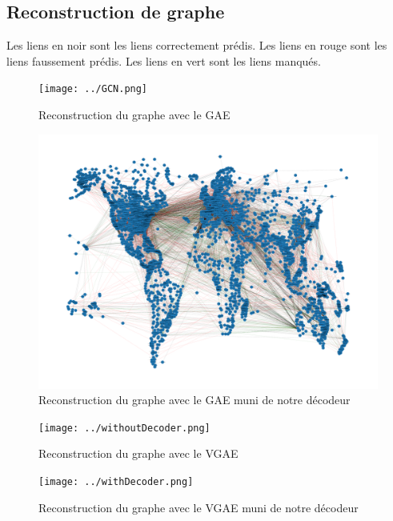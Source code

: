 \documentclass{article}
\begin{document}
\subsection{Reconstruction de graphe}

Les liens en noir sont les liens correctement prédis.\newline
Les liens en rouge sont les liens faussement prédis.\newline
Les liens en vert sont les liens manqués.

\begin{figure}[H]
    \centering
    \texttt{[image: ../GCN.png]}
    \caption{Reconstruction du graphe avec le GAE}
    \label{fig:fig_graphe_GAE}
\end{figure}

\begin{figure}[H]
    \centering
    \includegraphics[width=1\linewidth]{../GCNwithDecoder.png}
    \caption{Reconstruction du graphe avec le GAE muni de notre décodeur}
    \label{fig:fig_graphe_GAE_with_decodeur}
\end{figure}

\begin{figure}[H]
    \centering
    \texttt{[image: ../withoutDecoder.png]}
    \caption{Reconstruction du graphe avec le VGAE}
    \label{fig:fig_graphe_VGAE}
\end{figure}

\begin{figure}[H]
    \centering
    \texttt{[image: ../withDecoder.png]}
    \caption{Reconstruction du graphe avec le VGAE muni de notre décodeur}
    \label{fig:fig_graphe_VGAE_with_decodeur}
\end{figure}
\end{document}
